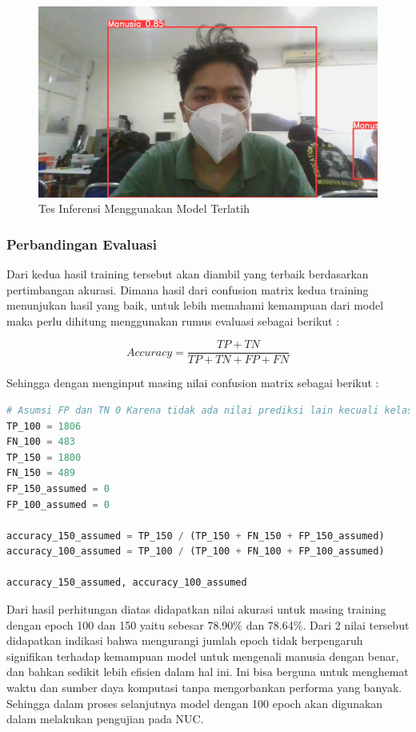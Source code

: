 \begin{figure}[H]
    \centering
    \includegraphics[scale=0.2]{gambar/confiden foto agung 150 epoch.jpg}
    \caption{Tes Inferensi Menggunakan Model Terlatih}
    \label{fig:enter-label}
\end{figure}

\subsubsection*{Perbandingan Evaluasi}

Dari kedua hasil training tersebut akan diambil yang terbaik berdasarkan pertimbangan akurasi. Dimana hasil dari confusion matrix kedua training menunjukan hasil yang baik, untuk lebih memahami kemampuan dari model maka perlu dihitung menggunakan rumus evaluasi sebagai berikut :

\begin{equation}
    Accuracy = \frac{TP + TN}{TP + TN + FP + FN}
\end{equation}

Sehingga dengan menginput masing nilai confusion matrix sebagai berikut :

\begin{lstlisting}[language=Python]
# Asumsi FP dan TN 0 Karena tidak ada nilai prediksi lain kecuali kelas manusia
TP_100 = 1806
FN_100 = 483
TP_150 = 1800
FN_150 = 489
FP_150_assumed = 0
FP_100_assumed = 0

accuracy_150_assumed = TP_150 / (TP_150 + FN_150 + FP_150_assumed)
accuracy_100_assumed = TP_100 / (TP_100 + FN_100 + FP_100_assumed)

accuracy_150_assumed, accuracy_100_assumed
\end{lstlisting}

Dari hasil perhitungan diatas didapatkan nilai akurasi untuk masing training dengan epoch 100 dan 150 yaitu sebesar 78.90\% dan 78.64\%. Dari 2 nilai tersebut didapatkan indikasi bahwa mengurangi jumlah epoch tidak berpengaruh signifikan terhadap kemampuan model untuk mengenali manusia dengan benar, dan bahkan sedikit lebih efisien dalam hal ini. Ini bisa berguna untuk menghemat waktu dan sumber daya komputasi tanpa mengorbankan performa yang banyak. Sehingga dalam proses selanjutnya model dengan 100 epoch akan digunakan dalam melakukan pengujian pada NUC.




